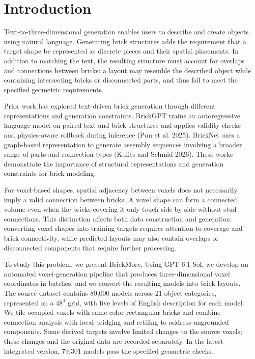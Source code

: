 \documentclass[10pt,twocolumn,letterpaper]{article}
\begin{document}
\section{Introduction}
Text-to-three-dimensional generation enables users to describe and create objects using natural language. Generating brick structures adds the requirement that a target shape be represented as discrete pieces and their spatial placements. In addition to matching the text, the resulting structure must account for overlaps and connections between bricks: a layout may resemble the described object while containing intersecting bricks or disconnected parts, and thus fail to meet the specified geometric requirements.

Prior work has explored text-driven brick generation through different representations and generation constraints. BrickGPT trains an autoregressive language model on paired text and brick structures and applies validity checks and physics-aware rollback during inference (Pun et al. 2025). BrickNet uses a graph-based representation to generate assembly sequences involving a broader range of parts and connection types (Kulits and Schmid 2026). These works demonstrate the importance of structural representations and generation constraints for brick modeling.

For voxel-based shapes, spatial adjacency between voxels does not necessarily imply a valid connection between bricks. A voxel shape can form a connected volume even when the bricks covering it only touch side by side without stud connections. This distinction affects both data construction and generation: converting voxel shapes into training targets requires attention to coverage and brick connectivity, while predicted layouts may also contain overlaps or disconnected components that require further processing.

To study this problem, we present BrickMore. Using GPT-6.1 Sol, we develop an automated voxel-generation pipeline that produces three-dimensional voxel coordinates in batches, and we convert the resulting models into brick layouts. The source dataset contains 80,000 models across 21 object categories, represented on a $48^3$ grid, with five levels of English description for each model. We tile occupied voxels with same-color rectangular bricks and combine connection analysis with local bridging and retiling to address ungrounded components. Some derived targets involve limited changes to the source voxels; these changes and the original data are recorded separately. In the latest integrated version, 79,301 models pass the specified geometric checks.
\end{document}
